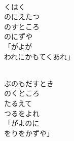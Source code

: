 \documentclass[10pt,b5j]{tarticle} %
\begin{document}
\vspace{1.5em} %
\newcommand{\linespace}{0.5em} %
\newcommand{\blocksize}{0.33\hsize} %
\newcommand{\itemmargin}{3em} %
\begin{enumerate} %
    \setlength{\itemindent}{\itemmargin} %
    \begin{minipage}[c]{\blocksize}
    
        \vspace{\linespace}
        \item~\\
        くはく\\
        のにえたつ\\
        のすところ\\
        のにずや\\
        「がよが\\
        われにかもてくあれ」
        
        \vspace{\linespace}
        \item~\\
        ぶのもだすとき\\
        のくところ\\
        たるえて\\
        つるをよれ\\
        「がよのに\\
        をりをかずや」
        
    \end{minipage}
    \begin{minipage}[c]{\blocksize}
        

\end{minipage}
\end{enumerate}
\end{document}

